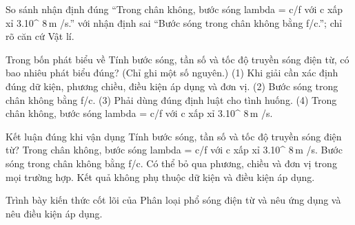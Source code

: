 \begin{bt}
So sánh nhận định đúng “Trong chân không, bước sóng lambda = c/f với c xấp xỉ 3.10^ $8\,\text{m}$ /s.” với nhận định sai “Bước sóng trong chân không bằng f/c.”; chỉ rõ căn cứ Vật lí.
\end{bt}

\begin{ex}
Trong bốn phát biểu về Tính bước sóng, tần số và tốc độ truyền sóng điện từ, có bao nhiêu phát biểu đúng? (Chỉ ghi một số nguyên.) (1) Khi giải cần xác định đúng dữ kiện, phương chiều, điều kiện áp dụng và đơn vị. (2) Bước sóng trong chân không bằng f/c. (3) Phải dùng đúng định luật cho tình huống. (4) Trong chân không, bước sóng lambda = c/f với c xấp xỉ 3.10^ $8\,\text{m}$ /s.
\end{ex}

\begin{ex}
Kết luận đúng khi vận dụng Tính bước sóng, tần số và tốc độ truyền sóng điện từ?
\choice
{\True Trong chân không, bước sóng lambda = c/f với c xấp xỉ 3.10^ $8\,\text{m}$ /s.}
{Bước sóng trong chân không bằng f/c.}
{Có thể bỏ qua phương, chiều và đơn vị trong mọi trường hợp.}
{Kết quả không phụ thuộc dữ kiện và điều kiện áp dụng.}
\end{ex}

\begin{bt}
Trình bày kiến thức cốt lõi của Phân loại phổ sóng điện từ và nêu ứng dụng và nêu điều kiện áp dụng.
\end{bt}

